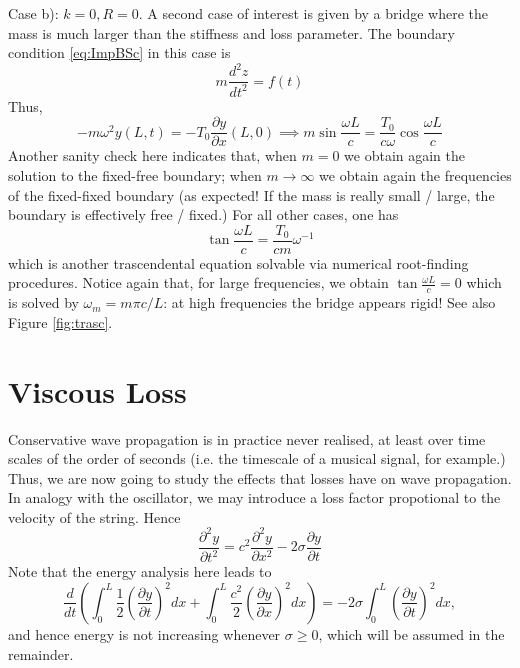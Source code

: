 \documentclass[11pt,twoside,a4paper,english]{book}
\begin{document}
\medskip \medskip 
\noindent 
Case b): $k=0,R=0$. A second case of interest is given by a bridge where the mass is much larger than the stiffness and loss parameter. The boundary condition \eqref{eq:ImpBSc} in this case is
\begin{equation}
m \frac{d^2z}{dt^2} = f(t)
\end{equation}
Thus,
\begin{equation}
-m \omega^2 y(L,t) = -T_0 \frac{\partial y}{\partial x}(L,0) \implies m  \sin \frac{\omega L}{c} =   \frac{T_0}{c\omega} \cos \frac{\omega L}{c}
\end{equation}
Another sanity check here indicates that, when $m=0$ we obtain again the solution to the fixed-free boundary; when $m\rightarrow \infty$ we obtain again the frequencies of the fixed-fixed boundary (as expected! If the mass is really small / large, the boundary is effectively free / fixed.) For all other cases, one has
\begin{equation}\label{eq:bc2}
\tan \frac{\omega L}{c} = \frac{T_0}{c m}\omega^{-1}
\end{equation}
which is another trascendental equation solvable via numerical root-finding procedures. Notice again that, for large frequencies, we obtain  $\tan\frac{\omega L}{c}= 0$ which is solved by $\omega_m = m\pi c / L$: at high frequencies the bridge appears rigid! See also Figure \ref{fig:trasc}.


\section{Viscous Loss}


Conservative wave propagation is in practice never realised, at least over time scales of the order of seconds (i.e. the timescale of a musical signal, for example.) Thus, we are now going to study the effects that losses have on wave propagation. In analogy with the oscillator, we may introduce a loss factor propotional to the velocity of the string. Hence
\begin{equation}\label{eq:WEloss}
\frac{\partial^2 y}{\partial t^2} = c^2 \frac{\partial^2 y}{\partial x^2} - 2\sigma   \frac{\partial y}{\partial t}
\end{equation}
Note that the energy analysis here leads to
\begin{equation}\label{eq:EnBalWE}
\frac{d}{dt}\left( \int_{0}^{L} \frac{1}{2}\left( \frac{\partial y}{\partial t} \right)^2 dx + \int_{0}^{L} \frac{c^2}{2}\left( \frac{\partial y}{\partial x} \right)^2 dx \right) = -2\sigma \int_0^L \left(\frac{\partial y}{\partial t}\right)^2 dx,
\end{equation}
and hence energy is not increasing whenever $\sigma \geq 0$, which will be assumed in the remainder. 
\end{document}
